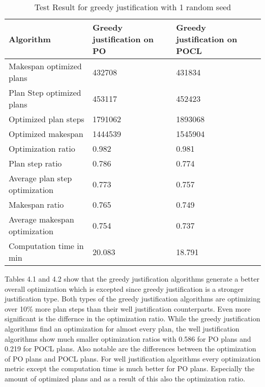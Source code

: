 \begin{table}[]
    \begin{tabular}{lll}
        \hline
        Algorithm                 & Greedy justification on PO & Greedy justification on POCL \\ \hline
        Makespan optimized plans  & 432708                     & 431834                       \\
        Plan Step optimized plans & 453117                     & 452423                       \\
        Optimized plan steps      & 1791062                    & 1893068                      \\
        Optimized makespan        & 1444539                    & 1545904                      \\
        Optimization ratio        & 0.982                      & 0.981                        \\
        Plan step ratio           & 0.786                      & 0.774                        \\
        Average plan step optimization &0.773                 & 0.757                          \\
        Makespan ratio            & 0.765                      & 0.749                        \\
        Average makespan optimization &0.754                 & 0.737                          \\
        Computation time in min   & 20.083                     & 18.791   
    \end{tabular}
    \caption{Test Result for greedy justification with 1 random seed}
\end{table}
Tables 4.1 and 4.2 show that the greedy justification algorithms generate a better overall optimization 
which is excepted since greedy justification is a stronger justification type. 
Both types of the greedy justification algorithms are optimizing over 10$\%$ more plan steps
than their well justification counterparts.
Even more significant is the differnce in the optimization ratio.
While the greedy justification algorithms find an optimization for almost every plan,
the well justification algorithms show much smaller optimization ratios with 
0.586 for PO plans and 0.219 for POCL plans. 
Also notable are the differences between the optimization of PO plans and POCL plans.
For well justification algorithms every optimization metric except the computation time is much better for PO plans.
Especially the amount of optimized plans and as a result of this also the optimization ratio.

